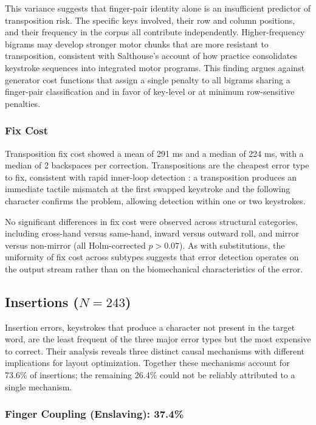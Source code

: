 \documentclass[12pt]{article}
\begin{document}
This variance suggests that finger-pair identity alone is an insufficient predictor of transposition risk. The specific keys involved, their row and column positions, and their frequency in the corpus all contribute independently. Higher-frequency bigrams may develop stronger motor chunks that are more resistant to transposition, consistent with Salthouse's \citep{salthouse1986} account of how practice consolidates keystroke sequences into integrated motor programs. This finding argues against generator cost functions that assign a single penalty to all bigrams sharing a finger-pair classification and in favor of key-level or at minimum row-sensitive penalties.

\subsubsection{Fix Cost}

Transposition fix cost showed a mean of 291 ms and a median of 224 ms, with a median of 2 backspaces per correction. Transpositions are the cheapest error type to fix, consistent with rapid inner-loop detection \citep{logan2010}: a transposition produces an immediate tactile mismatch at the first swapped keystroke and the following character confirms the problem, allowing detection within one or two keystrokes.

No significant differences in fix cost were observed across structural categories, including cross-hand versus same-hand, inward versus outward roll, and mirror versus non-mirror (all Holm-corrected $p > 0.07$). As with substitutions, the uniformity of fix cost across subtypes suggests that error detection operates on the output stream rather than on the biomechanical characteristics of the error.

\subsection{Insertions ($N = 243$)}

Insertion errors, keystrokes that produce a character not present in the target word, are the least frequent of the three major error types but the most expensive to correct. Their analysis reveals three distinct causal mechanisms with different implications for layout optimization. Together these mechanisms account for 73.6\% of insertions; the remaining 26.4\% could not be reliably attributed to a single mechanism.

\subsubsection{Finger Coupling (Enslaving): 37.4\%}
\end{document}
